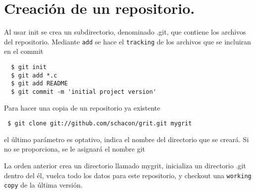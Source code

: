 \documentclass[]{article}
\title{}
\author{}
\begin{document}
\section{Creación de un repositorio.}

Al usar init se crea un subdirectorio, denominado .git, que contiene los archivos del repositorio. Mediante \texttt{add} se hace el \texttt{tracking} de los archivos que se incluiran en el commit






\begin{verbatim}
  $ git init
  $ git add *.c
  $ git add README
  $ git commit -m 'initial project version'
\end{verbatim}

Para hacer una copia de un repositorio ya existente

\begin{verbatim}
 $ git clone git://github.com/schacon/grit.git mygrit
\end{verbatim}

el último parámetro es optativo, indica el nombre del directorio que se creará. Si no se proporciona, se le asignará el nombre git

La orden anterior crea un directorio llamado mygrit, inicializa un directorio .git dentro del él, vuelca todo los datos para este repositorio, y checkout una \texttt{working copy} de la última versión.
\end{document}
